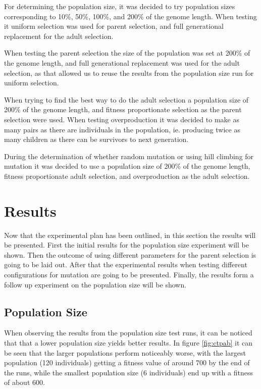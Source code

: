 For determining the population size, it was decided to try population sizes corresponding to 10\%, 50\%, 100\%, and 200\% of the genome length. When testing it uniform selection was used for parent selection, and full generational replacement for the adult selection.

When testing the parent selection the size of the population was set at 200\% of the genome length, and full generational replacement was used for the adult selection, as that allowed us to reuse the results from the population size run for uniform selection.

When trying to find the best way to do the adult selection a population size of 200\% of the genome length, and fitness proportionate selection as the parent selection were used. When testing overproduction it was decided to make as many pairs as there are individuals in the population, ie. producing twice as many children as there can be survivors to next generation.

During the determination of whether random mutation or using hill climbing for mutation it was decided to use a population size of 200\% of the genome length, fitness proportionate adult selection, and overproduction as the adult selection.


\clearpage

\section{Results} %
\label{sec:results}

Now that the experimental plan has been outlined, in this section the results will be presented. First the initial results for the population size experiment will be shown. Then the outcome of using different parameters for the parent selection is going to be laid out. After that the experimental results when testing different configurations for mutation are going to be presented. Finally, the results form a follow up experiment on the population size will be shown.

\subsection{Population Size} %
\label{sub:population_size}

When observing the results from the population size test runs, it can be noticed that that a lower population size yields better results. In figure \ref{fig:ctpab} it can be seen that the larger populations perform noticeably worse, with the largest population (120 individuals) getting a fitness value of around 700 by the end of the runs, while the smallest population size (6 individuals) end up with a fitness of about 600.

